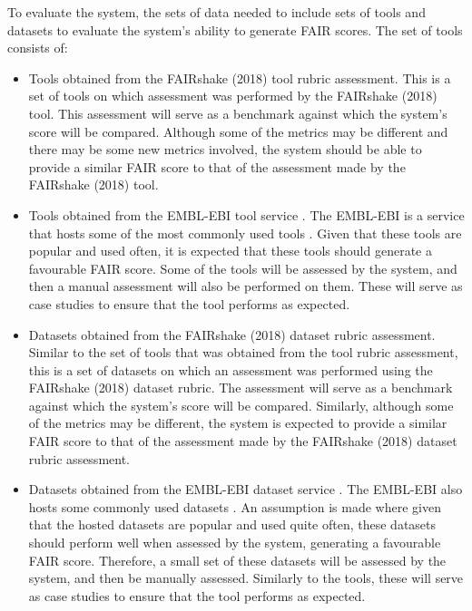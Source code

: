 \documentclass{cisfyp}
\begin{document}
To evaluate the system, the sets of data needed to include sets of tools and datasets to evaluate the system's ability to generate FAIR scores. The set of tools consists of:
\begin{itemize}
	\item Tools obtained from the FAIRshake (2018) tool rubric assessment.\newline
	This is a set of tools on which assessment was performed by the FAIRshake (2018) tool. This assessment will serve as a benchmark against which the system's score will be compared. Although some of the metrics may be different and there may be some new metrics involved, the system should be able to provide a similar FAIR score to that of the assessment made by the FAIRshake (2018) tool.
	
	\item Tools obtained from the EMBL-EBI tool service \cite{ebi}.\newline
	The EMBL-EBI is a service that hosts some of the most commonly used tools \cite{ebi}. Given that these tools are popular and used often, it is expected that these tools should generate a favourable FAIR score. Some of the tools will be assessed by the system, and then a manual assessment will also be performed on them. These will serve as case studies to ensure that the tool performs as expected.
	
	\item Datasets obtained from the FAIRshake (2018) dataset rubric assessment.\newline
	Similar to the set of tools that was obtained from the tool rubric assessment, this is a set of datasets on which an assessment was performed using the FAIRshake (2018) dataset rubric. The assessment will serve as a benchmark against which the system's score will be compared. Similarly, although some of the metrics may be different, the system is expected to provide 
	a similar FAIR score to that of the assessment made by the FAIRshake (2018) dataset rubric assessment.
	
	\item Datasets obtained from the EMBL-EBI dataset service \cite{ebi}.\newline
	The EMBL-EBI also hosts some commonly used datasets \cite{ebi}. An assumption is made where given that the hosted datasets are popular and used quite often, these datasets should perform well when assessed by the system, generating a favourable FAIR score. Therefore, a small set of these datasets will 
	be assessed by the system, and then be manually assessed. Similarly to the tools, these will serve as case studies to ensure that the tool performs as expected.
\end{itemize}
\end{document}
